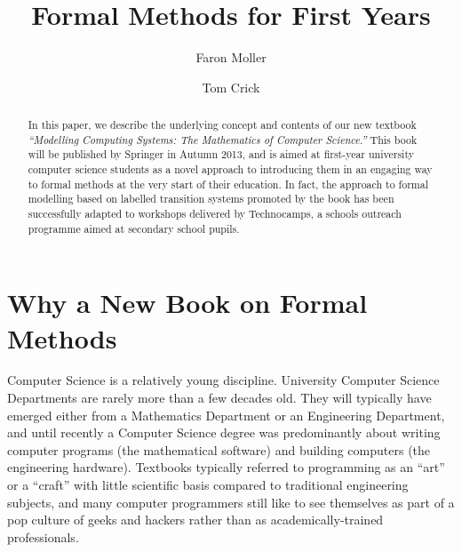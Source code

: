 \documentclass[sigconf]{acmart}
\begin{document}
\title{Formal Methods for First Years}
\author{Faron Moller}

\author{Tom Crick}

 


\begin{abstract}
In this paper, we describe the underlying concept and contents of our
new textbook \textit{``Modelling Computing Systems: The Mathematics of
Computer Science.''}  This book will be published by Springer in
Autumn 2013, and is aimed at first-year university computer science
students as a novel approach to introducing them in an engaging way to
formal methods at the very start of their education.  In fact, the
approach to formal modelling based on labelled transition systems
promoted by the book has been successfully adapted to workshops
delivered by Technocamps, a schools outreach programme aimed at
secondary school pupils.
\end{abstract}



\maketitle


\section{Why a New Book on Formal Methods}

Computer Science is a relatively young discipline.  University
Computer Science Departments are rarely more than a few decades
old. They will typically have emerged either from a Mathematics
Department or an Engineering Department, and until recently a Computer
Science degree was predominantly about writing computer programs (the
mathematical software) and building computers (the engineering
hardware).  Textbooks typically referred to programming as an ``art''
or a ``craft'' with little scientific basis compared to traditional
engineering subjects, and many computer programmers still like to see
themselves as part of a pop culture of geeks and hackers rather than
as academically-trained professionals.
\end{document}
